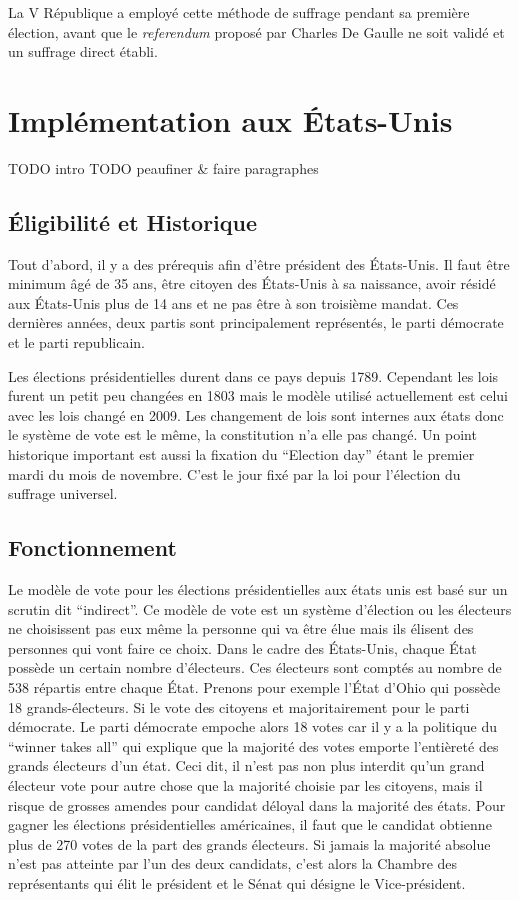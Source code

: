 \documentclass[11pt,a4paper]{report}
\begin{document}
La V République a employé cette méthode de suffrage pendant sa première élection, avant que le \textit{referendum} proposé par Charles De Gaulle ne soit validé et un suffrage direct établi. \nocite{polmania:scrutins}

\section{Implémentation aux États-Unis}
TODO intro
\nocite{wiki:eleccoll}
TODO peaufiner \& faire paragraphes

\subsection{Éligibilité et Historique}
Tout d’abord, il y a des prérequis afin d’être président des États-Unis.
Il faut être minimum âgé de 35 ans, être citoyen des États-Unis à sa naissance, avoir résidé aux États-Unis plus de 14 ans et ne pas être à son troisième mandat.
Ces dernières années, deux partis sont principalement représentés, le parti démocrate et le parti republicain.

Les élections présidentielles durent dans ce pays depuis 1789.
Cependant les lois furent un petit peu changées en 1803 mais le modèle utilisé actuellement est celui avec les lois changé en 2009.
Les changement de lois sont internes aux états donc le système de vote est le même, la constitution n'a elle pas changé.
Un point historique important est aussi la fixation du “Election day” étant le premier mardi du mois de novembre.
C’est le jour fixé par la loi pour l'élection du suffrage universel.

\subsection{Fonctionnement}
Le modèle de vote pour les élections présidentielles aux états unis est basé sur un scrutin dit “indirect”.
Ce modèle de vote est un système d'élection ou les électeurs ne choisissent pas eux même la personne qui va être élue mais ils élisent des personnes qui vont faire ce choix.
Dans le cadre des États-Unis, chaque État possède un certain nombre d'électeurs.
Ces électeurs sont comptés au nombre de 538 répartis entre chaque État.
Prenons pour exemple l'État d'Ohio qui possède 18 grands-électeurs.
Si le vote des citoyens et majoritairement pour le parti démocrate.
Le parti démocrate empoche alors 18 votes car il y a la politique du “winner takes all” qui explique que la majorité des votes emporte l'entièreté des grands électeurs d’un état.
Ceci dit, il n’est pas non plus interdit qu’un grand électeur vote pour autre chose que la majorité choisie par les citoyens, mais il risque de grosses amendes pour candidat déloyal dans la majorité des états.
Pour gagner les élections présidentielles américaines, il faut que le candidat obtienne plus de 270 votes de la part des grands électeurs.
Si jamais la majorité absolue n’est pas atteinte par l’un des deux candidats, c’est alors la Chambre des représentants qui élit le président et le Sénat qui désigne le Vice-président.
\nocite{wiki:electday}
\nocite{wiki:elecus}
\end{document}
